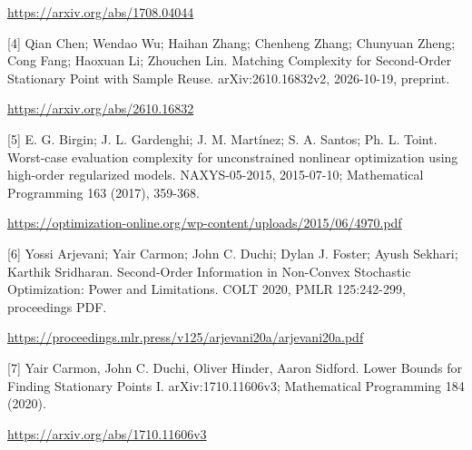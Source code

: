 \documentclass[10pt,a4paper]{article}
\begin{document}
\url{https://arxiv.org/abs/1708.04044}

[4] Qian Chen; Wendao Wu; Haihan Zhang; Chenheng Zhang; Chunyuan Zheng; Cong Fang; Haoxuan Li; Zhouchen Lin. Matching Complexity for Second-Order Stationary Point with Sample Reuse. arXiv:2610.16832v2, 2026-10-19, preprint.

\url{https://arxiv.org/abs/2610.16832}

[5] E. G. Birgin; J. L. Gardenghi; J. M. Martínez; S. A. Santos; Ph. L. Toint. Worst-case evaluation complexity for unconstrained nonlinear optimization using high-order regularized models. NAXYS-05-2015, 2015-07-10; Mathematical Programming 163 (2017), 359-368.

\url{https://optimization-online.org/wp-content/uploads/2015/06/4970.pdf}

[6] Yossi Arjevani; Yair Carmon; John C. Duchi; Dylan J. Foster; Ayush Sekhari; Karthik Sridharan. Second-Order Information in Non-Convex Stochastic Optimization: Power and Limitations. COLT 2020, PMLR 125:242-299, proceedings PDF.

\url{https://proceedings.mlr.press/v125/arjevani20a/arjevani20a.pdf}

[7] Yair Carmon, John C. Duchi, Oliver Hinder, Aaron Sidford. Lower Bounds for Finding Stationary Points I. arXiv:1710.11606v3; Mathematical Programming 184 (2020).

\url{https://arxiv.org/abs/1710.11606v3}
\end{document}

